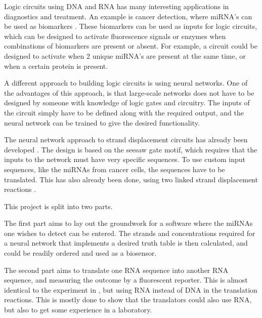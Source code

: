Logic circuits using DNA and RNA has many interesting applications in diagnostics and treatment. An example is cancer detection, where miRNA's can be used as biomarkers \cite{Peng2016}. These biomarkers can be used as inputs for logic circuits, which can be designed to activate fluorescence signals \cite{Seelig2006} or enzymes \cite{Engelen2016} when combinations of biomarkers are present or absent. For example, a circuit could be designed to activate when 2 unique miRNA's are present at the same time, or when a certain protein is present.

A different approach to building logic circuits is using neural networks. One of the advantages of this approach, is that large-scale networks does not have to be designed by someone with knowledge of logic gates and circuitry. The inputs of the circuit simply have to be defined along with the required output, and the neural network can be trained to give the desired functionality.

The neural network approach to strand displacement circuits has already been developed \cite{Qian2011}. The design is based on the seesaw gate motif, which requires that the inputs to the network must have very specific sequences. To use custom input sequences, like the miRNAs from cancer cells, the sequences have to be translated. This has also already been done, using two linked strand displacement reactions \cite{Picuri2009}.

This project is split into two parts.

The first part aims to lay out the groundwork for a software where the miRNAs one wishes to detect can be entered. The strands and concentrations required for a neural network that implements a desired truth table is then calculated, and could be readily ordered and used as a biosensor.

The second part aims to translate one RNA sequence into another RNA sequence, and measuring the outcome by a fluorescent reporter. This is almost identical to the experiment in \cite{Picuri2009}, but using RNA instead of DNA in the translation reactions. This is mostly done to show that the translators could also use RNA, but also to get some experience in a laboratory.
